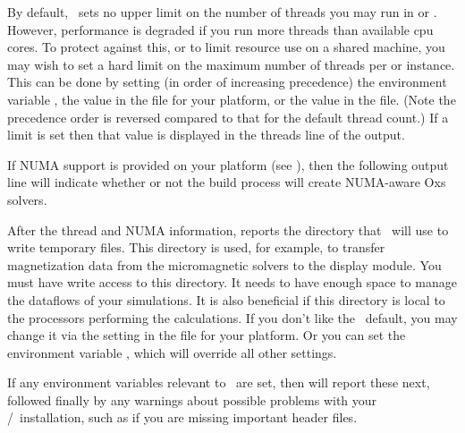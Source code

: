 By default, \OOMMF\ sets no upper limit on the number of threads you
may run in  or .  However, performance is degraded
if you run more threads than available cpu cores.  To protect against
this, or to limit resource use on a shared machine, you may wish to
set a hard limit on the maximum number of threads per  or
 instance.  This can be done by setting (in order of
increasing precedence) the environment variable
,
the  value
in the  file for your platform, or the
value in the  file.  (Note the precedence order is
reversed compared to that for the default thread count.)  If a limit
is set then that value is displayed in the threads line of the
 output.

If NUMA support is provided on your platform (see
),
then the following 
output line will indicate whether or not the build process
will create NUMA-aware Oxs solvers.

After the thread and NUMA information, 
reports the directory that \OOMMF\ will use to write temporary
files.  This directory is used, for example, to
transfer magnetization data from the micromagnetic solvers to the
 display module.  You must have write access to this
directory.  It needs to have enough space to manage the dataflows of
your simulations.  It is also beneficial if this directory is local to
the processors performing the calculations.  If you don't like the
\OOMMF\ default, you may change it via the
setting in the  file for your platform.  Or you
can set the environment variable
, which will
override all other settings.

If any environment variables relevant to \OOMMF\ are set, then
 will report these next, followed finally by any
warnings about possible problems with your \Tcl/\Tk\ installation, such
as if you are missing important header files.

